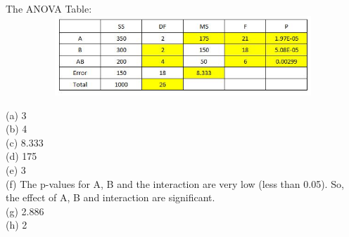 \documentclass[a4paper]{article}\usepackage{graphicx, color}
\begin{document}
\vspace{2 mm}
\raggedright{The ANOVA Table:}\\
\vspace{2 mm}
\includegraphics[width=140mm, height=30mm]{fig3.jpg}
\vspace{2 mm}

(a) 3 \\
(b) 4 \\
(c) 8.333 \\
(d) 175 \\
(e) 3 \\
(f) The p-values for A, B and the interaction are very low (less than 0.05). So, the effect of A, B and interaction are significant. \\
(g) 2.886\\
(h) 2\\
\end{document}
